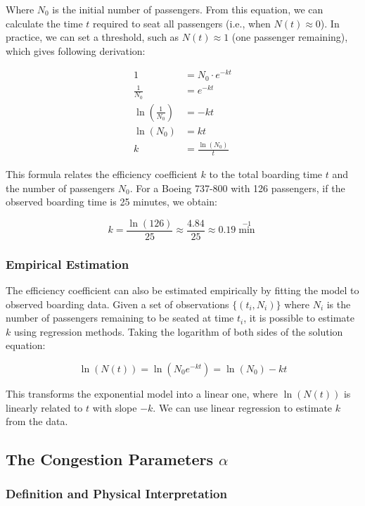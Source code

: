 \documentclass[12pt]{article}
\begin{document}
Where $N_0$ is the initial number of passengers. From this equation, we can calculate the time $t$ required to seat all passengers (i.e., when $N(t) \approx 0$). In practice, we can set a threshold, such as $N(t) \approx 1$ (one passenger remaining), which gives following derivation:

\begin{align}
1 &= N_0 \cdot e^{-kt} \\
\frac{1}{N_0} &= e^{-kt} \\
\ln\left(\frac{1}{N_0}\right) &= -kt \\
\ln(N_0) &= kt \\
k &= \frac{\ln(N_0)}{t}
\end{align}

This formula relates the efficiency coefficient $k$ to the total boarding time $t$ and the number of passengers $N_0$. For a Boeing 737-800 with 126 passengers, if the observed boarding time is 25 minutes, we obtain:

\begin{equation}
k = \frac{\ln(126)}{25} \approx \frac{4.84}{25} \approx 0.19 \min^{-1}
\end{equation}

\subsubsection{Empirical Estimation}

The efficiency coefficient can also be estimated empirically by fitting the model to observed boarding data. Given a set of observations $\{(t_i, N_i)\}$ where $N_i$ is the number of passengers remaining to be seated at time $t_i$, it is possible to estimate $k$ using regression methods. Taking the logarithm of both sides of the solution equation:

\begin{equation}
\ln(N(t)) = \ln(N_0 e^{-kt}) = \ln(N_0) - kt
\end{equation}

This transforms the exponential model into a linear one, where $\ln(N(t))$ is linearly related to $t$ with slope $-k$. We can use linear regression to estimate $k$ from the data.

\subsection{The Congestion Parameters $\alpha$}
\subsubsection{Definition and Physical Interpretation}
\end{document}
